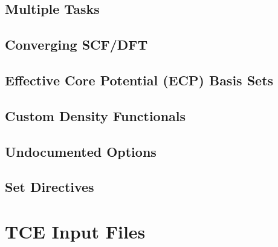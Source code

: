 \documentclass[letterpaper,12pt]{article}
\begin{document}
\newpage

\subsection{Multiple Tasks}\label{sec:MultipleTasks}

\newpage

\subsection{Converging SCF/DFT}\label{sec:ConvergingSCF}

\newpage

\subsection{Effective Core Potential (ECP) Basis Sets}\label{sec:ECPBasisSets}

\newpage

\subsection{Custom Density Functionals}\label{sec:CustomDensityFunctionals}

\newpage

\subsection{Undocumented Options}\label{sec:UndocumentedOptions}

\newpage

\subsection{Set Directives}\label{sec:SetDirectives}

\newpage

\section{TCE Input Files}\label{sec:TCEInputFiles}

\newpage
\end{document}
